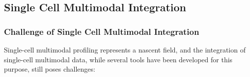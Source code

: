 
\subsection{Single Cell Multimodal Integration}
\subsubsection{Challenge of Single Cell Multimodal Integration}
\label{background:sec2:challenge_integration}
Single-cell multimodal profiling represents a nascent field, and the integration of single-cell multimodal data, while several tools have been developed for this purpose, still poses challenges:


